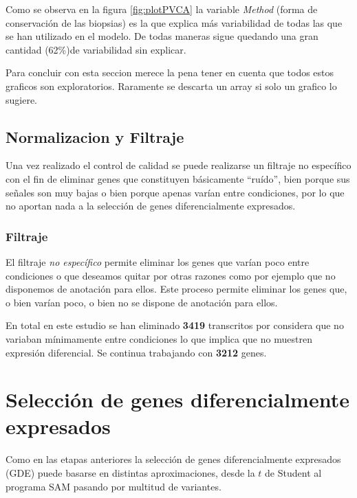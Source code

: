 \documentclass[a4paper]{article}\usepackage[]{graphicx}\usepackage[]{color}
\begin{document}
Como se observa en la figura \ref{fig:plotPVCA} la variable \textit{Method} (forma de conservación de las biopsias) es la que explica más variabilidad de todas las que se han utilizado en el modelo. De todas maneras sigue quedando una gran cantidad (62\%)de variabilidad sin explicar.

Para concluir con esta seccion merece la pena tener en cuenta que todos estos graficos son exploratorios. Raramente se descarta un array si solo un grafico lo sugiere.

\subsection{Normalizacion y Filtraje}

Una vez realizado el control de calidad se puede realizarse un
filtraje no específico con el fin de eliminar genes que constituyen
básicamente ``ruído'', bien porque sus señales son muy bajas o bien
porque apenas varían entre condiciones, por lo que no aportan nada a
la selección de genes diferencialmente expresados.

\subsubsection{Filtraje}

El filtraje \emph{no específico} permite eliminar los genes que varían poco entre condiciones o que deseamos quitar por otras razones como por ejemplo que no disponemos de anotación para ellos. Este proceso permite eliminar los genes que, o bien varían poco, o bien no se dispone de anotación para ellos.



En total en este estudio se han eliminado \textbf{3419} transcritos por considera que no variaban mínimamente entre condiciones lo que implica que no muestren expresión diferencial. Se continua trabajando con \textbf{3212} genes.



\section{Selección de genes diferencialmente expresados}

Como en las etapas anteriores la selección de genes diferencialmente
expresados (GDE) puede basarse en distintas aproximaciones, desde la
$t$ de Student al programa SAM pasando por multitud de variantes.
\end{document}
